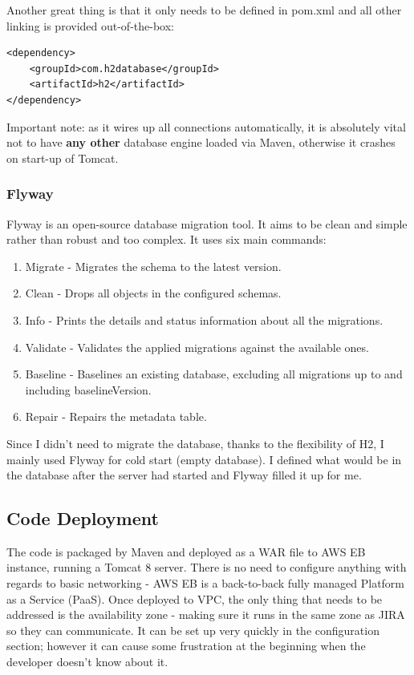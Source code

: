 Another great thing is that it only needs to be defined in pom.xml and all other linking is provided out-of-the-box:

\bigbreak

\begin{lstlisting}
<dependency>
    <groupId>com.h2database</groupId>
    <artifactId>h2</artifactId>
</dependency>
\end{lstlisting}

Important note: as it wires up all connections automatically, it is absolutely vital not to have {\bf any other} database engine loaded via Maven, otherwise it crashes on start-up of Tomcat.

\subsubsection{Flyway}

Flyway is an open-source database migration tool. It aims to be clean and simple rather than robust and too complex. It uses six main commands:

\begin{enumerate}
	\item Migrate - Migrates the schema to the latest version.
	\item Clean - Drops all objects in the configured schemas.
	\item Info - Prints the details and status information about all the migrations.
	\item Validate - Validates the applied migrations against the available ones.
	\item Baseline - Baselines an existing database, excluding all migrations up to and including baselineVersion.
	\item Repair - Repairs the metadata table.
\end{enumerate}

Since I didn't need to migrate the database, thanks to the flexibility of H2, I mainly used Flyway for cold start (empty database). I defined what would be in the database after the server had started and Flyway filled it up for me.

\newpage

\subsection{Code Deployment}

The code is packaged by Maven and deployed as a WAR file to AWS EB instance, running a Tomcat 8 server. There is no need to configure anything with regards to basic networking - AWS EB is a back-to-back fully managed Platform as a Service (PaaS). Once deployed to VPC, the only thing that needs to be addressed is the availability zone - making sure it runs in the same zone as JIRA so they can communicate. It can be set up very quickly in the configuration section; however it can cause some frustration at the beginning when the developer doesn't know about it.

